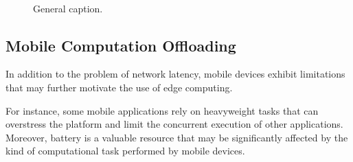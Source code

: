 
\begin{figure}[tbp]
	\centering
	\hfill
	~
	\hfill
	\caption{General caption.} \label{fig:1}
\end{figure}

\subsection{Mobile Computation Offloading}

In addition to the problem of network latency, mobile devices exhibit limitations that may further motivate the use of edge computing. 

For instance, some mobile applications rely on heavyweight tasks that can overstress the platform and limit the concurrent execution of other applications. Moreover, battery is a valuable resource that may be significantly affected by the kind of computational task performed by mobile devices. 

